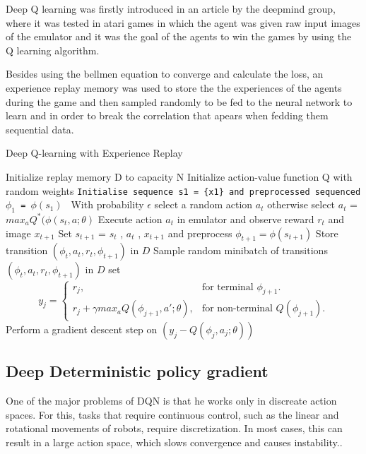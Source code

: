 \documentclass[12pt]{extarticle}
\begin{document}
Deep Q learning was firstly introduced in an article by the deepmind group, where it was tested in atari games in which the agent was given raw input images of the emulator and it was the  goal of the agents to win the games by using the Q learning algorithm.

Besides using the bellmen equation to converge and calculate the loss, an experience replay memory was used to store the the experiences of the agents during  the game and then sampled randomly to be  fed to the neural network to learn and in order to break the correlation that apears when fedding them sequential data.\cite{mnih2013playing}
 
\begin{algorithm}
\caption{Deep Q-learning with Experience Replay}\label{alg:cap}
\begin{algorithmic}
\State Initialize replay memory D to capacity N
\State Initialize action-value function Q with random weights
        \State \texttt{Initialise sequence s1 = \{x1\} and preprocessed sequenced $\phi_{1}$ = $\phi(s_{1})$  }
         \State With probability $\epsilon$ select a random action $a_{t}$
         \State otherwise select  $a_{t}$ = $max_{a} Q^{*}(\phi(s_{t},a;\theta) $ 
         \State Execute action $a_{t}$ in emulator and observe reward ${r_{t}}$ and image $x_{t+1}$
        \State Set $s_{t+1}$ = $s_{t}$ , $a_{t}$ , $x_{t+1}$ and preprocess  
        $\phi_{t+1}=\phi(s_{t+1})$
        \State Store transition $(\phi_{t} , a_{t} , r_{t} , \phi_{t+1} )$ in $D$
        \State Sample random
minibatch of transitions $(\phi_{t} , a_{t} , r_{t} , \phi_{t+1} )$ in $D$
        \State set  \begin{equation}
  y_{j}=\begin{cases}
    r_{j}, & \text{for terminal $\phi_{j+1} $}.\\
    r_{j}+\gamma max_{a}Q(\phi_{j+1},a';\theta) , & \text{for non-terminal $Q(\phi_{j+1})$}.
  \end{cases}
\end{equation}
        \State Perform a gradient descent step on $(y_{j} - Q(\phi_{j} , a_{j} ; \theta))$ 
        \EndFor 
\EndFor 


\end{algorithmic}
\end{algorithm}
 


\pagebreak

\subsection{Deep Deterministic policy gradient }
One of the major problems of DQN is that he works only in discreate action spaces. For this, tasks that require continuous control, such as the linear and rotational movements of robots, require discretization. In most cases, this can result in a large action space, which slows convergence and causes instability.. \cite{lillicrap2015continuous}
\end{document}
